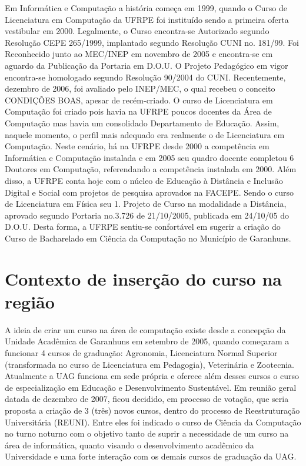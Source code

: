 \documentclass[
	12pt,				%
	openright,			%
  oneside,     %
	a4paper,			%
	english,			%
	french,				%
	spanish,			%
	brazil				%
	]{abntex2}
\begin{document}
Em Informática e Computação a história começa em 1999, quando o Curso de
Licenciatura em Computação da UFRPE foi instituído sendo a primeira oferta
vestibular em 2000. Legalmente, o Curso encontra-se Autorizado segundo Resolução
CEPE 265/1999, implantado segundo Resolução CUNI no. 181/99. Foi Reconhecido
junto ao MEC/INEP em novembro de 2005 e encontra-se em aguardo da Publicação da
Portaria em D.O.U. O Projeto Pedagógico em vigor encontra-se homologado segundo
Resolução 90/2004 do CUNI. Recentemente, dezembro de 2006, foi avaliado pelo
INEP/MEC, o qual recebeu o conceito CONDIÇÕES BOAS, apesar de recém-criado.
O curso de Licenciatura em Computação foi criado pois havia na UFRPE poucos
docentes da Área de Computação mas havia um consolidado Departamento de
Educação. Assim, naquele momento, o perfil mais adequado era realmente o de
Licenciatura em Computação. Neste cenário, há na UFRPE desde 2000 a
competência em Informática e Computação instalada e em 2005 seu quadro
docente completou 6 Doutores em Computação, referendando a competência
instalada em 2000. Além disso, a UFRPE conta hoje com o núcleo de Educação à Distância e Inclusão Digital e Social com projetos de pesquisa aprovados na
FACEPE. Sendo o curso de Licenciatura em Física seu 1. Projeto de Curso na
modalidade a Distância, aprovado segundo Portaria no.3.726  de  21/10/2005,
publicada em 24/10/05 do D.O.U. Desta forma, a UFRPE sentiu-se confortável
em sugerir a criação do Curso de Bacharelado em Ciência da Computação no
Município de Garanhuns.



\section*{Contexto de inserção do curso na região}

A ideia de criar um curso na área de computação existe desde a concepção da
Unidade Acadêmica de Garanhuns em setembro de 2005, quando começaram a funcionar
4 cursos de graduação: Agronomia, Licenciatura Normal Superior (transformada no
curso de Licenciatura em Pedagogia), Veterinária e Zootecnia. Atualmente a UAG
funciona em sede própria e oferece além desses cursos o curso de especialização
em Educação e Desenvolvimento Sustentável. Em reunião geral datada de dezembro
de 2007, ficou decidido, em processo de votação, que seria proposta a criação de
3 (três) novos cursos, dentro do processo de Reestruturação Universitária
(REUNI). Entre eles foi indicado o curso de Ciência da Computação no turno noturno com o
objetivo tanto de suprir a necessidade de um curso na área de informática,
quanto visando o desenvolvimento acadêmico da Universidade e uma forte interação
com os demais cursos de graduação da UAG.
\end{document}
